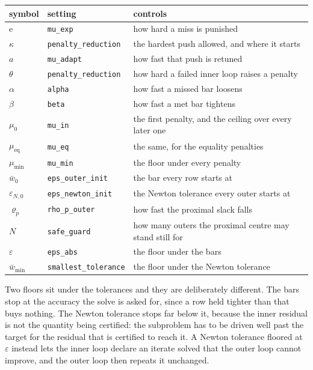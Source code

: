 \documentclass[a4paper,11pt]{book}
\theoremstyle{plain}
\theoremstyle{definition}
\theoremstyle{remark}
\numberwithin{equation}{chapter}
\numberwithin{algorithm}{chapter}
\begin{document}
	\begin{table}[H]
		\centering\small
		\begin{tabular}{lll}
			\toprule
			symbol & setting & controls\\
			\midrule
			$\mathrm{e}$ & \texttt{mu\_exp} & how hard a miss is punished\\
			$\kappa$ & \texttt{penalty\_reduction} & the hardest push allowed, and
			where it starts\\
			$a$ & \texttt{mu\_adapt} & how fast that push is retuned\\
			$\theta$ & \texttt{penalty\_reduction} & how hard a failed inner loop
			raises a penalty\\
			$\alpha$ & \texttt{alpha} & how fast a missed bar loosens\\
			$\beta$ & \texttt{beta} & how fast a met bar tightens\\
			$\mu_0$ & \texttt{mu\_in} & the first penalty, and the ceiling over
			every later one\\
			$\mu_{\mathrm{eq}}$ & \texttt{mu\_eq} & the same, for the equality
			penalties\\
			$\mu_{\min}$ & \texttt{mu\_min} & the floor under every penalty\\
			$\bar w_0$ & \texttt{eps\_outer\_init} & the bar every row starts at\\
			$\varepsilon_{N,0}$ & \texttt{eps\_newton\_init} & the Newton tolerance
			every outer starts at\\
			$\varrho_p$ & \texttt{rho\_p\_outer} & how fast the proximal slack
			falls\\
			$N$ & \texttt{safe\_guard} & how many outers the proximal centre may
			stand still for\\
			$\varepsilon$ & \texttt{eps\_abs} & the floor under the bars\\
			$\bar w_{\min}$ & \texttt{smallest\_tolerance} & the floor under the
			Newton tolerance\\
			\bottomrule
		\end{tabular}
	\end{table}

	Two floors sit under the tolerances and they are deliberately different. The
	bars stop at the accuracy the solve is asked for, since a row held tighter
	than that buys nothing. The Newton tolerance stops far below it, because the
	inner residual is not the quantity being certified: the subproblem has to be
	driven well past the target for the residual that is certified to reach it. A
	Newton tolerance floored at $\varepsilon$ instead lets the inner loop declare
	an iterate solved that the outer loop cannot improve, and the outer loop then
	repeats it unchanged.
\end{document}
